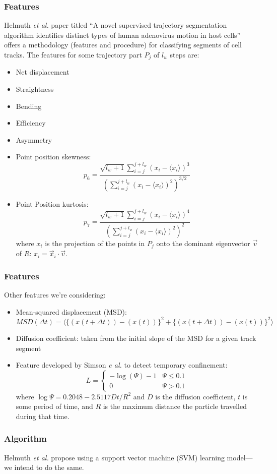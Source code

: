 \documentclass[8pt]{beamer}
\begin{document}
\begin{frame}
  \frametitle{Features}
  Helmuth \emph{et al.} paper titled ``A novel supervised trajectory
  segmentation algorithm identifies distinct types of human adenovirus
  motion in host cells'' offers a methodology (features and procedure)
  for classifying segments of cell tracks.
  The features for some trajectory part $P_j$ of $l_w$ steps are:
  \begin{itemize}
  \item Net displacement
  \item Straightness
  \item Bending
  \item Efficiency
  \item Asymmetry
  \item Point position skewness: 
    \begin{equation*}
      p_6 = \frac{\sqrt{l_w + 1}\sum_{i=j}^{j+l_w}(x_i-\langle x_i
        \rangle)^3}{\left( \sum^{j+l_w}_{i=j}(x_i-\langle x_i
          \rangle)^2  \right)^{3/2}}
    \end{equation*}
  \item Point Position kurtosis: 
    \begin{equation*}
      p_7 = \frac{\sqrt{l_w + 1}\sum^{j+l_w}_{i=j}(x_i-\langle x_i
        \rangle)^4}{\left( \sum^{j+l_w}_{i=j}(x_i-\langle x_i
          \rangle)^2  \right)^{2}}
    \end{equation*}
    where $x_i$ is the projection of the points in $P_j$ onto the
    dominant eigenvector $\vec{v}$ of $R$: $x_i = \vec{x}_i \cdot \vec{v}$.
  \end{itemize}
\end{frame}

\begin{frame}
  \frametitle{Features}
  Other features we're considering:
  \begin{itemize}
  \item Mean-squared displacement (MSD):
    \begin{equation*}
      MSD(\Delta t) = \langle \{ (x(t+\Delta t)) - (x(t)) \}^2 + \{
       (x(t+\Delta t)) - (x(t)) \}^2 \rangle
    \end{equation*}
  \item Diffusion coefficient: taken from the initial slope of the MSD
    for a given track segment
  \item Feature developed by Simson \emph{e al.} to detect temporary
    confinement:
    \begin{equation*}
      L =
      \begin{cases}
        -\log(\Psi) -1 & \Psi \leq 0.1 \\
        0 & \Psi > 0.1
      \end{cases}
    \end{equation*}
    where $\log \Psi = 0.2048 - 2.5117 Dt/R^2$
    and $D$ is the diffusion coefficient, $t$ is some period of
    time, and $R$ is the maximum distance the particle travelled
    during that time.
  \end{itemize}
\end{frame}

\begin{frame}
  \frametitle{Algorithm}
  Helmuth \emph{et al.} propose using a support vector machine (SVM)
  learning model---we intend to do the same.
\end{frame}
\end{document}

